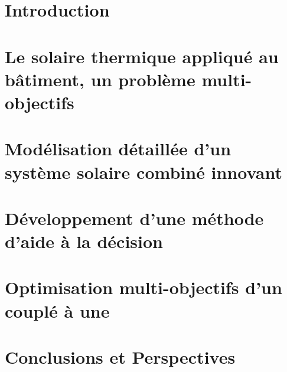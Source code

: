 \documentclass[11pt, oneside]{JeremyThesis}
\begin{document}

\chapter*{Introduction}
%
%


\chapter{Le solaire thermique appliqué au bâtiment, un problème multi-objectifs}


\chapter{Modélisation détaillée d’un système solaire combiné innovant}


\chapter{Développement d’une méthode d’aide à la décision}


\chapter{Optimisation multi-objectifs d’un  couplé à une }


\chapter*{Conclusions et Perspectives}
%
%



\clearpage
\thesisPrintbibliography
\end{document}
